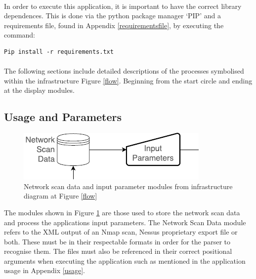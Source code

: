 \paragraph{}In order to execute this application, it is important to have the correct library dependences. This is done via the python package manager ‘PIP’ and a requirements file, found in Appendix \ref{requirementsfile}, by executing the command:
\lstset{language=Python}
\begin{lstlisting}
Pip install -r requirements.txt
\end{lstlisting}

\paragraph{}The following sections include detailed descriptions of the processes symbolised within the infrastructure Figure \ref{flow}.  Beginning from the start circle and ending at the display modules.\linebreak

\subsection{Usage and Parameters}
\label{infra1}

\begin{figure}[!h]
\centering
\includegraphics{./Figures/infra1.png}
\caption{Network scan data and input parameter modules from infrastructure diagram at Figure \ref{flow}}
\label{infra1}
\end{figure}

The modules shown in Figure \ref{infra1} are those used to store the network scan data and process the applications input parameters. The Network Scan Data module refers to the XML output of an Nmap scan, Nessus proprietary export file or both. These must be in their respectable formats in order for the parser to recognise them. The files must also be referenced in their correct positional arguments when executing the application such as mentioned in the application usage in Appendix \ref{usage}.

